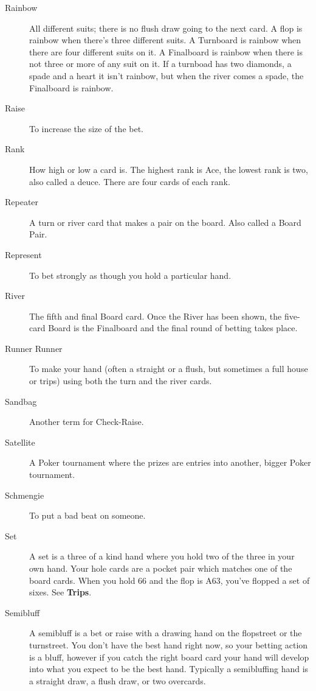 \begin{description}
\item[Rainbow] All different suits; there is no flush
draw going to the next card. A flop is rainbow when there's three
different suits. A Turnboard is rainbow when there are four different
suits on it. A Finalboard is rainbow when there is not
three or more of any suit on it. If a turnboad has two diamonds, a
spade and a heart it isn't rainbow, but when the river comes a spade,
the Finalboard is rainbow.

\item[Raise] To increase the size of the bet.

\item[Rank] How high or low a card is. The highest rank is Ace, the
lowest rank is two, also called a deuce. There are four cards of
each rank.

\item[Repeater] A turn or river card that makes a pair on the
board. Also called a Board Pair.

\item[Represent] To bet strongly as though you hold a particular hand.

\item[River] The fifth and final Board card. Once the River has been
shown, the five-card Board is the Finalboard and the final round of
betting takes place.

\item[Runner Runner] To make your hand (often a straight or a flush,
but sometimes a full house or trips) using both the turn and the
river cards.

\item[Sandbag] Another term for Check-Raise.

\item[Satellite] A Poker tournament where the prizes are entries into
another, bigger Poker tournament.

\item[Schmengie] To put a bad beat on someone.

\item[Set] A set is a three of a kind hand where you hold two of the
three in your own hand. Your hole cards are a pocket pair which
matches one of the board cards. When you hold 66 and the flop is A63,
you've flopped a set of sixes. See \textbf{Trips}.

\item[Semibluff] A semibluff is a bet or raise with a drawing hand on
the flopstreet or the turnstreet. You don't have the best hand right
now, so your betting action is a bluff, however if you catch the right
board card your hand will develop into what you expect to be the best
hand. Typically a semibluffing hand is a straight draw, a flush draw,
or two overcards.


\end{description}
